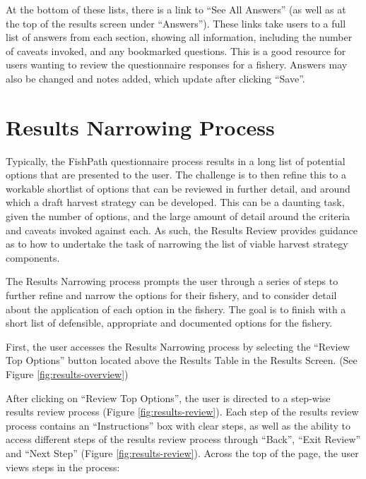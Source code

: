\documentclass[
  11pt,
]{book}
\begin{document}
At the bottom of these lists, there is a link to ``See All Answers'' (as well as at the top of the results screen under ``Answers''). These links take users to a full list of answers from each section, showing all information, including the number of caveats invoked, and any bookmarked questions. This is a good resource for users wanting to review the questionnaire responses for a fishery. Answers may also be changed and notes added, which update after clicking ``Save''.

\hypertarget{Results-Narrowing}{%
\section{Results Narrowing Process}\label{Results-Narrowing}}

Typically, the FishPath questionnaire process results in a long list of potential options that are presented to the user. The challenge is to then refine this to a workable shortlist of options that can be reviewed in further detail, and around which a draft harvest strategy can be developed. This can be a daunting task, given the number of options, and the large amount of detail around the criteria and caveats invoked against each. As such, the Results Review provides guidance as to how to undertake the task of narrowing the list of viable harvest strategy components.

The Results Narrowing process prompts the user through a series of steps to further refine and narrow the options for their fishery, and to consider detail about the application of each option in the fishery. The goal is to finish with a short list of defensible, appropriate and documented options for the fishery.

First, the user accesses the Results Narrowing process by selecting the ``Review Top Options'' button located above the Results Table in the Results Screen. (See Figure \ref{fig:results-overview})

After clicking on ``Review Top Options'', the user is directed to a step-wise results review process (Figure \ref{fig:results-review}). Each step of the results review process contains an ``Instructions'' box with clear steps, as well as the ability to access different steps of the results review process through ``Back'', ``Exit Review'' and ``Next Step'' (Figure \ref{fig:results-review}). Across the top of the page, the user views steps in the process:
\end{document}
